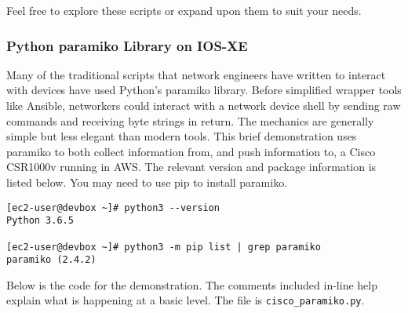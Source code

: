 Feel free to explore these scripts or expand upon them to suit your needs.

\subsubsection{Python paramiko Library on IOS-XE}
Many of the traditional scripts that network engineers have written to
interact with devices have used Python's paramiko library. Before simplified
wrapper tools like Ansible, networkers could interact with a network device
shell by sending raw commands and receiving byte strings in return. The
mechanics are generally simple but less elegant than modern tools. This brief
demonstration uses paramiko to both collect information from, and push
information to, a Cisco CSR1000v running in AWS\@. The relevant version and
package information is listed below. You may need to use pip to install paramiko.

\begin{verbatim}
[ec2-user@devbox ~]# python3 --version
Python 3.6.5

[ec2-user@devbox ~]# python3 -m pip list | grep paramiko
paramiko (2.4.2)
\end{verbatim}

Below is the code for the demonstration. The comments included in-line help
explain what is happening at a basic level. The file is \verb|cisco_paramiko.py|.

